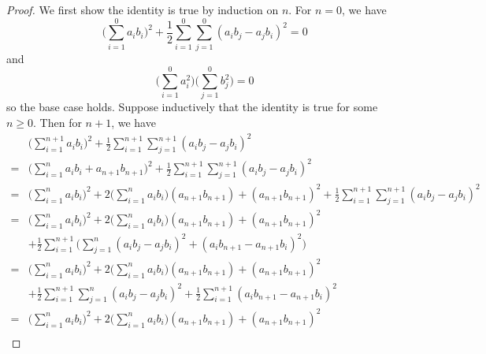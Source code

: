 \begin{proof}
    We first show the identity is true by induction on \(n\).
    For \(n = 0\), we have
    \[
        \bigg(\sum_{i = 1}^0 a_i b_i\bigg)^2 + \frac{1}{2} \sum_{i = 1}^0 \sum_{j = 1}^0 (a_i b_j - a_j b_i)^2 = 0
    \]
    and
    \[
        \bigg(\sum_{i = 1}^0 a_i^2\bigg) \bigg(\sum_{j = 1}^0 b_j^2\bigg) = 0
    \]
    so the base case holds.
    Suppose inductively that the identity is true for some \(n \geq 0\).
    Then for \(n + 1\), we have
    \begin{align*}
          & \bigg(\sum_{i = 1}^{n + 1} a_i b_i\bigg)^2 + \frac{1}{2} \sum_{i = 1}^{n + 1} \sum_{j = 1}^{n + 1} (a_i b_j - a_j b_i)^2                                                                                  \\
        = & \bigg(\sum_{i = 1}^n a_i b_i + a_{n + 1} b_{n + 1}\bigg)^2 + \frac{1}{2} \sum_{i = 1}^{n + 1} \sum_{j = 1}^{n + 1} (a_i b_j - a_j b_i)^2                                                                  \\
        = & \bigg(\sum_{i = 1}^n a_i b_i\bigg)^2 + 2 \bigg(\sum_{i = 1}^n a_i b_i\bigg) (a_{n + 1} b_{n + 1}) + (a_{n + 1} b_{n + 1})^2 + \frac{1}{2} \sum_{i = 1}^{n + 1} \sum_{j = 1}^{n + 1} (a_i b_j - a_j b_i)^2 \\
        = & \bigg(\sum_{i = 1}^n a_i b_i\bigg)^2 + 2 \bigg(\sum_{i = 1}^n a_i b_i\bigg) (a_{n + 1} b_{n + 1}) + (a_{n + 1} b_{n + 1})^2                                                                               \\
          & + \frac{1}{2} \sum_{i = 1}^{n + 1} \bigg(\sum_{j = 1}^n (a_i b_j - a_j b_i)^2 + (a_i b_{n + 1} - a_{n + 1} b_i)^2\bigg)                                                                                   \\
        = & \bigg(\sum_{i = 1}^n a_i b_i\bigg)^2 + 2 \bigg(\sum_{i = 1}^n a_i b_i\bigg) (a_{n + 1} b_{n + 1}) + (a_{n + 1} b_{n + 1})^2                                                                               \\
          & + \frac{1}{2} \sum_{i = 1}^{n + 1} \sum_{j = 1}^n (a_i b_j - a_j b_i)^2 + \frac{1}{2} \sum_{i = 1}^{n + 1} (a_i b_{n + 1} - a_{n + 1} b_i)^2                                                              \\
        = & \bigg(\sum_{i = 1}^n a_i b_i\bigg)^2 + 2 \bigg(\sum_{i = 1}^n a_i b_i\bigg) (a_{n + 1} b_{n + 1}) + (a_{n + 1} b_{n + 1})^2                                                                               \\

\end{align*}
\end{proof}

